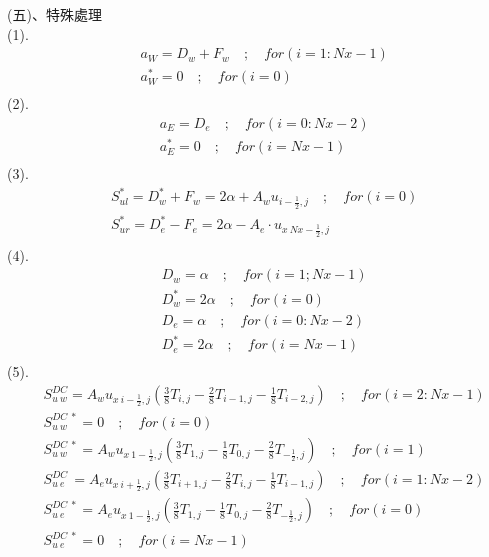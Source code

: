 \documentclass[12pt]{article}
\begin{document}
\newpage
(五)、特殊處理\\
\noindent 
(1).\\
\begin{equation}
\begin{split}
    &a_{W} = D_{w} + F_{w} \quad;\quad for (i = 1 : Nx-1)\\
    &a_{W}^{*} = 0 \quad;\quad for(i = 0)\\
\end{split}
\end{equation}
(2).
\begin{equation}
\begin{split}
    &a_{E} = D_{e} \quad;\quad for (i = 0 : Nx-2)\\
    &a_{E}^{*} = 0\quad;\quad for(i = Nx-1 )\\
\end{split}
\end{equation}
(3).
\begin{equation}
\begin{split}
    &S_{ul}^{*} = D_{w}^{*} + F_{w}  = 2\alpha + A_{w}u_{i-\frac{1}{2},j}\quad;\quad for (i = 0)\\
    &S_{ur}^{*} = D_{e}^{*} - F_{e} = 2\alpha - A_{e}\cdot u_{x\ Nx-\frac{1}{2},j}\\
\end{split}
\end{equation}
(4).
\begin{equation}
\begin{split}
    &D_{w} = \alpha \quad;\quad for(i = 1 ; Nx-1)\\
    &D_{w}^{*} = 2\alpha\quad;\quad for (i = 0)\\
    &D_{e} = \alpha \quad;\quad for(i = 0 : Nx-2)\\
    &D_{e}^{*} = 2\alpha \quad;\quad for(i = Nx-1)\\
\end{split}
\end{equation}
(5).
\begin{equation}
\begin{split}
    &S_{u\ w}^{DC} = A_{w}u_{x\ i-\frac{1}{2},j}(\frac{3}{8}T_{i,j} - \frac{2}{8}T_{i-1,j} - \frac{1}{8}T_{i-2,j})  \quad;\quad for (i = 2 : Nx-1)\\
    &S_{u\ w}^{DC\ *} = 0 \quad;\quad for (i = 0)\\
    &S_{u\ w}^{DC\ *} = A_{w}u_{x\ 1-\frac{1}{2},j}(\frac{3}{8}T_{1,j} - \frac{1}{8}T_{0,j} - \frac{2}{8}T_{-\frac{1}{2},j}) \quad;\quad for (i = 1)\\
    &S_{u\ e}^{DC\ } = A_{e}u_{x\ i+\frac{1}{2},j}(\frac{3}{8}T_{i+1,j} - \frac{2}{8}T_{i,j} - \frac{1}{8}T_{i-1,j}) \quad;\quad for (i = 1 : Nx-2)\\
    &S_{u\ e}^{DC\ *} = A_{e}u_{x\ 1-\frac{1}{2},j}(\frac{3}{8}T_{1,j} - \frac{1}{8}T_{0,j} - \frac{2}{8}T_{-\frac{1}{2},j}) \quad;\quad for(i = 0)\\
    &S_{u\ e}^{DC\ *} = 0  \quad;\quad for(i = Nx-1)\\
\end{split}
\end{equation}
\end{document}
